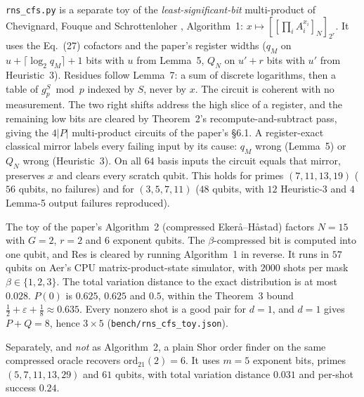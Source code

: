 \documentclass[11pt]{article}
\newcommand{\code}[1]{\texttt{#1}}
\theoremstyle{plain}
\theoremstyle{remark}
\begin{document}
\begin{warnbox}[title={What is built, and what is not}]
\code{rns\_cfs.py} is a separate toy of the \emph{least-significant-bit}
multi-product of Chevignard, Fouque and Schrottenloher \cite{cfs24},
Algorithm~1: $x\mapsto[[\prod_iA_i^{x_i}]_N]_{2^r}$. It uses the Eq.~(27)
cofactors and the paper's register widths ($q_M$ on $u+\lceil\log_2q_M\rceil+1$
bits with $u$ from Lemma~5, $Q_N$ on $u'+r$ bits with $u'$ from Heuristic~3).
Residues follow Lemma~7: a sum of discrete logarithms, then a table of
$g_p^S\bmod p$ indexed by $S$, never by $x$. The circuit is coherent with
no measurement. The two right shifts address the high slice of a register,
and the remaining low bits are cleared by Theorem~2's recompute-and-subtract
pass, giving the $4|P|$ multi-product circuits of the paper's \S6.1. A
register-exact classical mirror labels every failing input by its cause:
$q_M$ wrong (Lemma~5) or $Q_N$ wrong (Heuristic~3). On all $64$ basis inputs
the circuit equals that mirror, preserves $x$ and clears every scratch
qubit. This holds for primes $(7,11,13,19)$ ($56$ qubits, no failures) and
for $(3,5,7,11)$ ($48$ qubits, with $12$ Heuristic-3 and $4$ Lemma-5 output
failures reproduced).

The toy of the paper's Algorithm~2 (compressed Eker\aa--H\aa stad) factors
$N=15$ with $G=2$, $r=2$ and $6$ exponent qubits. The $\beta$-compressed
bit is computed into one qubit, and Res is cleared by running Algorithm~1
in reverse. It runs in $57$ qubits on Aer's CPU matrix-product-state
simulator, with $2000$ shots per mask $\beta\in\{1,2,3\}$. The total
variation distance to the exact distribution is at most $0.028$. $P(0)$ is
$0.625$, $0.625$ and $0.5$, within the Theorem~3 bound
$\tfrac12+\varepsilon+\tfrac18\approx0.635$. Every nonzero shot is a good
pair for $d=1$, and $d=1$ gives $P+Q=8$, hence $3\times5$
(\code{bench/rns\_cfs\_toy.json}).

Separately, and \emph{not} as Algorithm~2, a plain Shor order finder on the
same compressed oracle recovers $\mathrm{ord}_{21}(2)=6$. It uses
$m=5$ exponent bits, primes $(5,7,11,13,29)$ and $61$ qubits, with total
variation distance $0.031$ and per-shot success $0.24$.


\end{warnbox}
\end{document}
